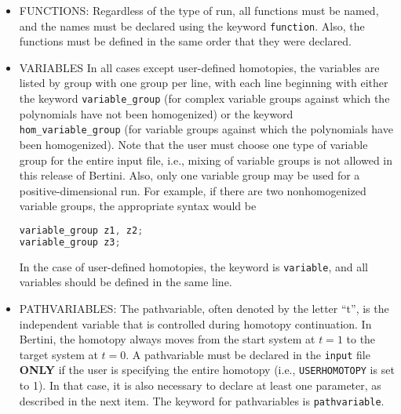 \begin{itemize}

\item{FUNCTIONS:}
Regardless of the type of run, all functions must be named, and the names must be declared using the keyword \texttt{function}. Also, the functions must be defined in the same order that they were declared.

\item{VARIABLES}
In all cases except user-defined homotopies, the variables are listed by group with one group per line, with each line beginning with either the keyword \texttt{variable\_group} (for complex variable groups against which the polynomials have not been homogenized) or the keyword \texttt{hom\_variable\_group} (for variable groups against which the polynomials have been homogenized).
 Note that the user must choose one type of variable group for the entire input file, i.e., mixing of variable groups is not allowed in this release of Bertini. Also, only one variable group may be used for a positive-dimensional run. For example, if there are two
 nonhomogenized variable groups, the appropriate syntax would be
\begin{center}\begin{minipage}{0.9\linewidth}

\begin{lstlisting}[language=c++, caption=Adapted from \cite{BM13}, captionpos=b]
variable_group z1, z2;
variable_group z3;
\end{lstlisting}
\end{minipage}\end{center}

In the case of user-defined homotopies, the keyword is \texttt{variable}, and all variables should be defined in the same line.

\item{PATHVARIABLES:}
The pathvariable, often denoted by the letter “t”, is the independent variable that is controlled during homotopy continuation. In Bertini, the homotopy always moves from the start system at $t = 1$ to the target system at $t = 0$. A pathvariable must be declared in the \texttt{input} file \textbf{ONLY} if the user is specifying the entire homotopy (i.e., \texttt{USERHOMOTOPY} is set to 1). In that case, it is also necessary to declare at least one parameter, as described in the next item. The keyword for pathvariables is \texttt{pathvariable}.


\end{itemize}
